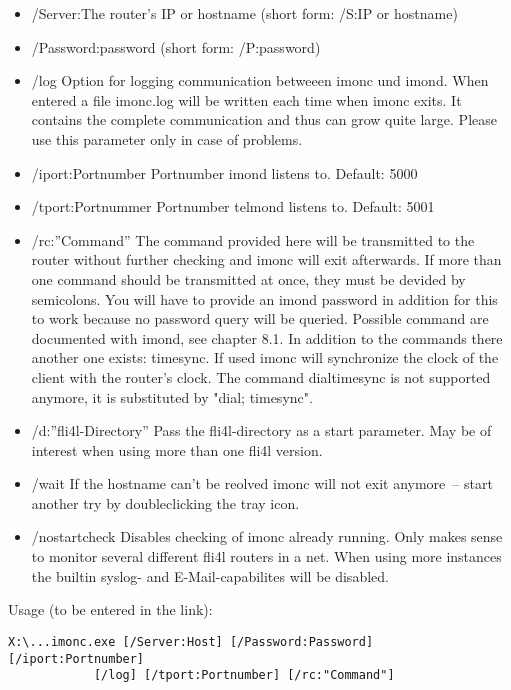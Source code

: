   \begin{itemize}
    \item /Server:The router's IP or hostname (short form: /S:IP or hostname)
    \item /Password:password (short form: /P:password)
    \item /log Option for logging communication betweeen imonc und imond. When
      entered a file imonc.log  will be written each time when imonc exits. It
      contains the complete communication and thus can grow quite large. Please
      use this parameter only in case of problems.
    \item /iport:Portnumber Portnumber imond listens to. Default: 5000
    \item /tport:Portnummer Portnumber telmond listens to. Default: 5001
    \item /rc:''Command'' The command provided here will be transmitted to the
      router without further checking and imonc will exit afterwards. 
      If more than one command should be transmitted at once, they must be devided
      by semicolons. You will have to provide an imond password in addition for
      this to work because no password query will be queried. Possible command
      are documented with imond, see chapter 8.1. In addition to the commands
      there another one exists: timesync. If used imonc will synchronize the
      clock of the client with the router's clock. The command dialtimesync is
      not supported anymore, it is substituted by "dial; timesync".
    \item /d:''fli4l-Directory'' Pass the fli4l-directory as a start parameter.
      May be of interest when using more than one fli4l version.
    \item /wait If the hostname can't be reolved imonc will not exit anymore~--
      start another try by doubleclicking the tray icon.
    \item /nostartcheck Disables checking of imonc already running. Only makes
      sense to monitor several different fli4l routers in a net. When using more
      instances the builtin syslog- and \mbox{E-Mail}-capabilites will be disabled.
  \end{itemize}

  Usage (to be entered in the link):

\begin{example}
\begin{verbatim}
X:\...imonc.exe [/Server:Host] [/Password:Password] [/iport:Portnumber]
            [/log] [/tport:Portnumber] [/rc:"Command"]
\end{verbatim}
\end{example}

